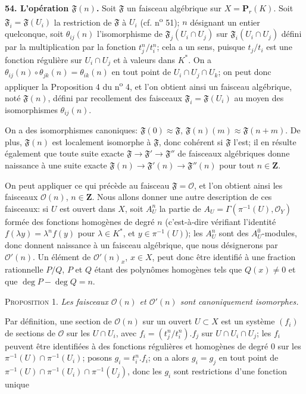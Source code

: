 \textbf{54. L'opération $\mathfrak{F}(n)$.} Soit $\mathfrak{F}$ un faisceau algébrique sur $X = \mathbf{P}_r(K)$. Soit $\mathfrak{F}_i = \mathfrak{F}(U_i)$ la restriction de $\mathfrak{F}$ à $U_i$ (cf. n\textsuperscript{o} 51); $n$ désignant un entier quelconque, soit $\theta_{ij}(n)$ l'isomorphisme de $\mathfrak{F}_j(U_i \cap U_j)$ sur $\mathfrak{F}_i(U_i \cap U_j)$ défini par la multiplication par la fonction $t_j^n/t_i^n$; cela a un sens, puisque $t_j/t_i$ est une fonction régulière sur $U_i \cap U_j$ et à valeurs dans $K^*$. On a $\theta_{ij}(n) \circ \theta_{jk}(n) = \theta_{ik}(n)$ en tout point de $U_i \cap U_j \cap U_k$; on peut donc appliquer la Proposition 4 du n\textsuperscript{o} 4, et l'on obtient ainsi un faisceau algébrique, noté $\mathfrak{F}(n)$, défini par recollement des faisceaux $\mathfrak{F}_i = \mathfrak{F}(U_i)$ au moyen des isomorphismes $\theta_{ij}(n)$.

On a des isomorphismes canoniques: $\mathfrak{F}(0) \approx \mathfrak{F}$, $\mathfrak{F}(n)(m) \approx \mathfrak{F}(n + m)$. De plus, $\mathfrak{F}(n)$ est localement isomorphe à $\mathfrak{F}$, donc cohérent si $\mathfrak{F}$ l'est; il en résulte également que toute suite exacte $\mathfrak{F} \to \mathfrak{F}' \to \mathfrak{F}''$ de faisceaux algébriques donne naissance à une suite exacte $\mathfrak{F}(n) \to \mathfrak{F}'(n) \to \mathfrak{F}''(n)$ pour tout $n \in \mathbf{Z}$.

On peut appliquer ce qui précède au faisceau $\mathfrak{F} = \mathcal{O}$, et l'on obtient ainsi les faisceaux $\mathcal{O}(n)$, $n \in \mathbf{Z}$. Nous allons donner une autre description de ces faisceaux: si $U$ est ouvert dans $X$, soit $A_U^n$ la partie de $A_U = \Gamma(\pi^{-1}(U), \mathcal{O}_Y)$ formée des fonctions homogènes de degré $n$ (c'est-à-dire vérifiant l'identité $f(\lambda y) = \lambda^n f(y)$ pour $\lambda \in K^*$, et $y \in \pi^{-1}(U)$); les $A_U^n$ sont des $A_U^0$-modules, donc donnent naissance à un faisceau algébrique, que nous désignerons par $\mathcal{O}'(n)$. Un élément de $\mathcal{O}'(n)_x$, $x \in X$, peut donc être identifié à une fraction rationnelle $P/Q$, $P$ et $Q$ étant des polynômes homogènes tels que $Q(x) \neq 0$ et que $\deg P - \deg Q = n$.

\textsc{Proposition} 1. \textit{Les faisceaux $\mathcal{O}(n)$ et $\mathcal{O}'(n)$ sont canoniquement isomorphes.}

Par définition, une section de $\mathcal{O}(n)$ sur un ouvert $U \subset X$ est un système $(f_i)$ de sections de $\mathcal{O}$ sur les $U \cap U_i$, avec $f_i = (t_j^n/t_i^n).f_j$ sur $U \cap U_i \cap U_j$; les $f_i$ peuvent être identifiées à des fonctions régulières et homogènes de degré 0 sur les $\pi^{-1}(U) \cap \pi^{-1}(U_i)$; posons $g_i = t_i^n.f_i$; on a alors $g_i = g_j$ en tout point de $\pi^{-1}(U) \cap \pi^{-1}(U_i) \cap \pi^{-1}(U_j)$, donc les $g_i$ sont restrictions d'une fonction unique


